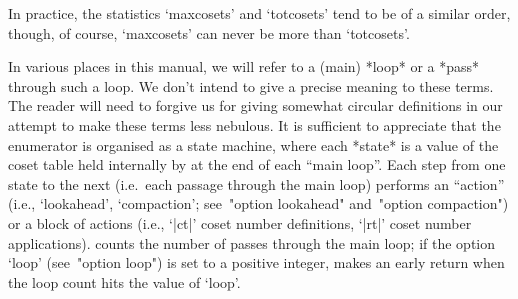 In practice, the statistics `maxcosets' and `totcosets' tend to be  of
a similar order, though, of course, `maxcosets' can never be more than
`totcosets'.


In various places in this manual, we will refer to a (main) *loop*  or
a *pass* through such a loop.  We  don't  intend  to  give  a  precise
meaning to these terms. The reader will need to forgive us for  giving
somewhat circular definitions in our attempt to make these terms  less
nebulous. It is sufficient to appreciate that the {\ACE} enumerator is
organised as a state machine, where each *state* is  a  value  of  the
coset table held internally by  {\ACE}  at  the  end  of  each  ``main
loop''. Each step from  one  state  to  the  next  (i.e.~each  passage
through the main loop)  performs  an  ``action''  (i.e.,  `lookahead',
`compaction'; see~"option lookahead"  and~"option  compaction")  or  a
block of actions (i.e., `|ct|' coset number definitions, `|rt|'  coset
number applications). {\ACE} counts the number of passes  through  the
main loop; if the option  `loop'  (see~"option  loop")  is  set  to  a
positive integer, {\ACE} makes an early return  when  the  loop  count
hits the value of `loop'.


